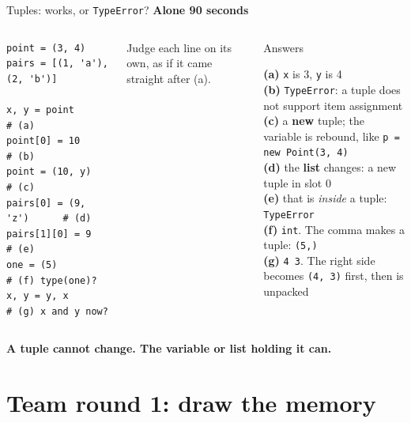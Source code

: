 \documentclass[aspectratio=169]{beamer}
\newcommand{\keyline}[1]{\vfill\begin{center}\textcolor{bkblue}{\textbf{#1}}\end{center}\vspace*{0.2em}}
\newcommand{\code}[1]{\texttt{#1}}
\newcommand{\timing}[2]{\hfill{\small\textcolor{bkblue}{\textbf{#1 \textbullet{} #2}}}}
\newcommand{\yes}{\textcolor{goodgreen}{\ding{51}}}
\newcommand{\no}{\textcolor{badred}{\ding{55}}}
\begin{document}
\begin{frame}[fragile]{Tuples: works, or \texttt{TypeError}? \timing{Alone}{90 seconds}}
  \begin{columns}[T,onlytextwidth]
\begin{lstlisting}[language=Py]
point = (3, 4)
pairs = [(1, 'a'), (2, 'b')]

x, y = point             # (a)
point[0] = 10            # (b)
point = (10, y)          # (c)
pairs[0] = (9, 'z')      # (d)
pairs[1][0] = 9          # (e)
one = (5)                # (f) type(one)?
x, y = y, x              # (g) x and y now?
\end{lstlisting}
    {\small Judge each line on its own, as if it came straight after (a).}
    \pause
    \begin{contextbox}{Answers}
      \footnotesize\raggedright
      \textbf{(a)} \yes{} \code{x} is 3, \code{y} is 4\\[0.1em]
      \textbf{(b)} \no{} \code{TypeError}: a tuple does not support item
      assignment\\[0.1em]
      \textbf{(c)} \yes{} a \textbf{new} tuple; the variable is rebound, like
      \code{p = new Point(3, 4)}\\[0.1em]
      \textbf{(d)} \yes{} the \textbf{list} changes: a new tuple in slot 0\\[0.1em]
      \textbf{(e)} \no{} that is \emph{inside} a tuple: \code{TypeError}\\[0.1em]
      \textbf{(f)} \code{int}. The comma makes a tuple: \code{(5,)}\\[0.1em]
      \textbf{(g)} \code{4 3}. The right side becomes \code{(4, 3)} first, then is
      unpacked
    \end{contextbox}
  \end{columns}
  \keyline{A tuple cannot change. The variable or list holding it can.}
\end{frame}

\section{Team round 1: draw the memory}
\end{document}
